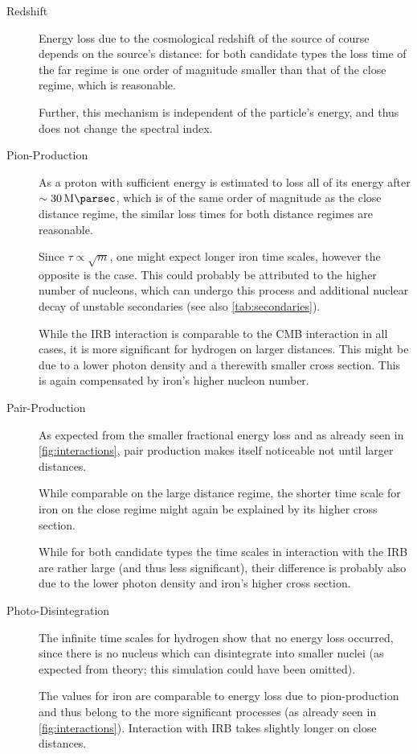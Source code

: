 \begin{description}
    \item[Redshift]
        Energy loss due to the cosmological redshift of the source of course
        depends on the source's distance: for both candidate types the loss
        time of the far regime is one order of magnitude smaller than that of
        the close regime, which is reasonable.

        Further, this mechanism is
        independent of the particle's energy, and thus does not change the
        spectral index.

    \item[Pion-Production]
        As a proton with sufficient energy is estimated to loss all of its energy
        after $\sim\SI{30}{\mega\parsec}$, which is of the same order of
        magnitude as the close distance regime, the similar loss times for both
        distance regimes are reasonable.

        Since $\tau\propto\sqrt{m}$, one might expect longer iron time scales,
        however the opposite is the case. This could probably be attributed
        to the higher number of nucleons, which can undergo this process and
        additional nuclear decay of unstable secondaries (see also
        \cref{tab:secondaries}).

        While the IRB interaction is comparable to the CMB interaction in all
        cases, it is more significant for hydrogen on larger distances. This
        might be due to a lower photon density and a therewith smaller cross
        section. This is again compensated by iron's higher nucleon number.

    \item[Pair-Production]
        As expected from the smaller fractional energy loss and as already seen
        in \cref{fig:interactions}, pair production makes itself noticeable not
        until larger distances.

        While comparable on the large distance regime, the shorter time scale
        for iron on the close regime might again be explained by its higher cross
        section.

        While for both candidate types the time scales in interaction with the
        IRB are rather large (and thus less significant), their difference is
        probably also due to the lower photon density and iron's higher cross
        section.

    \item[Photo-Disintegration]
        The infinite time scales for hydrogen show that no energy loss
        occurred, since there is no nucleus which can disintegrate into smaller
        nuclei (as expected from theory; this simulation could have been
        omitted).

        The values for iron are comparable to energy loss due to
        pion-production and thus belong to the more significant processes (as
        already seen in \cref{fig:interactions}). Interaction with IRB takes
        slightly longer on close distances.
\end{description}

